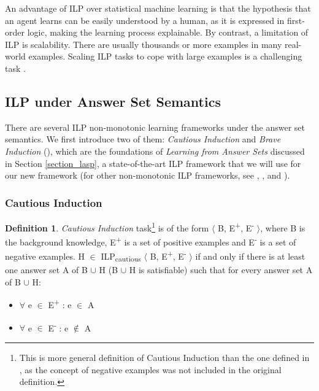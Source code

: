 \documentclass[11pt,twoside]{report}
\theoremstyle{plain}
\theoremstyle{definition}
\newtheorem{defn}[thm]{Definition} %
\begin{document}
An advantage of ILP over statistical machine learning is that the hypothesis that an agent learns can be easily understood by a human, as it is expressed in first-order logic, making the learning process explainable.
By contrast, a limitation of ILP is scalability. There are usually thousands or more examples in many real-world examples. Scaling ILP tasks to cope with large examples is a challenging task \cite{Muggleton1993}.

\subsection{ILP under Answer Set Semantics}
There are several ILP non-monotonic learning frameworks under the answer set semantics. 
We first introduce two of them: \textit{Cautious Induction} and \textit{Brave Induction} (\cite{Sakama2009}), 
which are the foundations of \textit{Learning from Answer Sets} discussed in Section \ref{section_lasp}, a state-of-the-art ILP framework that we will use for our new framework (for other non-monotonic ILP frameworks, see \cite{Otero2001}, \cite{Inoue2014}, \cite{Corapi2012} and \cite{DeRaedt1997}).
\subsubsection{Cautious Induction}

\begin{defn}
\textit{Cautious Induction} task\footnote{This is more general definition of Cautious Induction than the one defined in \cite{Sakama2009}, as the concept of negative examples was not included in the original definition.} 
is of the form $\langle$ B, E\textsuperscript{+}, E\textsuperscript{-} $\rangle$, where B is the background knowledge, E\textsuperscript{+} is a set of positive examples and E\textsuperscript{-} is a set of negative examples.
H $\in$ ILP\textsubscript{cautious} $\langle$ B, E\textsuperscript{+}, E\textsuperscript{-} $\rangle$ if and only if  there is at least one answer set A of B $\cup$ H (B $\cup$ H is satisfiable) such that for every answer set A of B $\cup$ H:
\begin{itemize}
\item $\forall$ e $\in$ E\textsuperscript{+} : e $\in$ A
\item $\forall$ e $\in$ E\textsuperscript{-} : e $\notin$ A
\end{itemize}
\end{defn}
\end{document}
